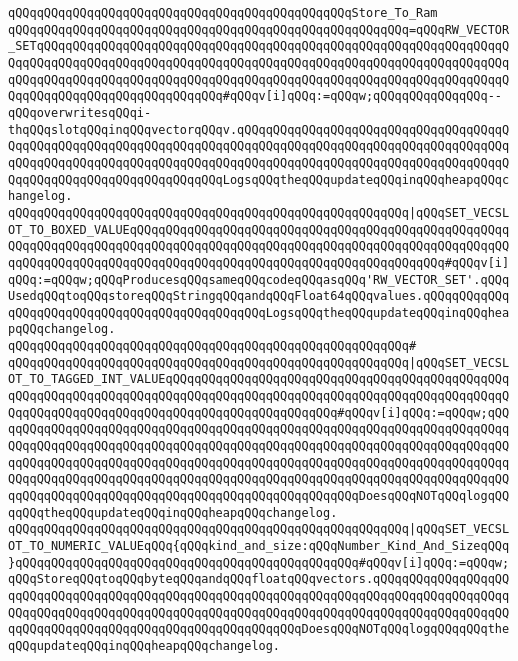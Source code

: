 \verb|qQQqqQQqqQQqqQQqqQQqqQQqqQQqqQQqqQQqqQQqqQQqqQQqStore_To_Ram|\newline
\verb|qQQqqQQqqQQqqQQqqQQqqQQqqQQqqQQqqQQqqQQqqQQqqQQqqQQqqQQq=qQQqRW_VECTOR_SETqQQqqQQqqQQqqQQqqQQqqQQqqQQqqQQqqQQqqQQqqQQqqQQqqQQqqQQqqQQqqQQqqQQqqQQqqQQqqQQqqQQqqQQqqQQqqQQqqQQqqQQqqQQqqQQqqQQqqQQqqQQqqQQqqQQqqQQqqQQqqQQqqQQqqQQqqQQqqQQqqQQqqQQqqQQqqQQqqQQqqQQqqQQqqQQqqQQqqQQqqQQqqQQqqQQqqQQqqQQqqQQqqQQqqQQqqQQq#qQQqv[i]qQQq:=qQQqw;qQQqqQQqqQQqqQQq--qQQqoverwritesqQQqi-thqQQqslotqQQqinqQQqvectorqQQqv.qQQqqQQqqQQqqQQqqQQqqQQqqQQqqQQqqQQqqQQqqQQqqQQqqQQqqQQqqQQqqQQqqQQqqQQqqQQqqQQqqQQqqQQqqQQqqQQqqQQqqQQqqQQqqQQqqQQqqQQqqQQqqQQqqQQqqQQqqQQqqQQqqQQqqQQqqQQqqQQqqQQqqQQqqQQqqQQqqQQqqQQqqQQqqQQqqQQqqQQqqQQqqQQqLogsqQQqtheqQQqupdateqQQqinqQQqheapqQQqchangelog.|\newline
\verb|qQQqqQQqqQQqqQQqqQQqqQQqqQQqqQQqqQQqqQQqqQQqqQQqqQQqqQQq|\verb#|qQQqSET_VECSLOT_TO_BOXED_VALUEqQQqqQQqqQQqqQQqqQQqqQQqqQQqqQQqqQQqqQQqqQQqqQQqqQQqqQQqqQQqqQQqqQQqqQQqqQQqqQQqqQQqqQQqqQQqqQQqqQQqqQQqqQQqqQQqqQQqqQQqqQQqqQQqqQQqqQQqqQQqqQQqqQQqqQQqqQQqqQQqqQQqqQQqqQQqqQQqqQQqqQQq#\verb|#qQQqv[i]qQQq:=qQQqw;qQQqProducesqQQqsameqQQqcodeqQQqasqQQq'RW_VECTOR_SET'.qQQqUsedqQQqtoqQQqstoreqQQqStringqQQqandqQQqFloat64qQQqvalues.qQQqqQQqqQQqqQQqqQQqqQQqqQQqqQQqqQQqqQQqqQQqqQQqLogsqQQqtheqQQqupdateqQQqinqQQqheapqQQqchangelog.|\newline
\verb|qQQqqQQqqQQqqQQqqQQqqQQqqQQqqQQqqQQqqQQqqQQqqQQqqQQqqQQq#|\newline
\verb|qQQqqQQqqQQqqQQqqQQqqQQqqQQqqQQqqQQqqQQqqQQqqQQqqQQqqQQq|\verb#|qQQqSET_VECSLOT_TO_TAGGED_INT_VALUEqQQqqQQqqQQqqQQqqQQqqQQqqQQqqQQqqQQqqQQqqQQqqQQqqQQqqQQqqQQqqQQqqQQqqQQqqQQqqQQqqQQqqQQqqQQqqQQqqQQqqQQqqQQqqQQqqQQqqQQqqQQqqQQqqQQqqQQqqQQqqQQqqQQqqQQqqQQqqQQqqQQq#\verb|#qQQqv[i]qQQq:=qQQqw;qQQqqQQqqQQqqQQqqQQqqQQqqQQqqQQqqQQqqQQqqQQqqQQqqQQqqQQqqQQqqQQqqQQqqQQqqQQqqQQqqQQqqQQqqQQqqQQqqQQqqQQqqQQqqQQqqQQqqQQqqQQqqQQqqQQqqQQqqQQqqQQqqQQqqQQqqQQqqQQqqQQqqQQqqQQqqQQqqQQqqQQqqQQqqQQqqQQqqQQqqQQqqQQqqQQqqQQqqQQqqQQqqQQqqQQqqQQqqQQqqQQqqQQqqQQqqQQqqQQqqQQqqQQqqQQqqQQqqQQqqQQqqQQqqQQqqQQqqQQqqQQqqQQqqQQqqQQqqQQqqQQqqQQqqQQqDoesqQQqNOTqQQqlogqQQqqQQqtheqQQqupdateqQQqinqQQqheapqQQqchangelog.|\newline
\verb|qQQqqQQqqQQqqQQqqQQqqQQqqQQqqQQqqQQqqQQqqQQqqQQqqQQqqQQq|\verb#|qQQqSET_VECSLOT_TO_NUMERIC_VALUEqQQq{qQQqkind_and_size:qQQqNumber_Kind_And_SizeqQQq}qQQqqQQqqQQqqQQqqQQqqQQqqQQqqQQqqQQqqQQqqQQqqQQq#\verb|#qQQqv[i]qQQq:=qQQqw;qQQqStoreqQQqtoqQQqbyteqQQqandqQQqfloatqQQqvectors.qQQqqQQqqQQqqQQqqQQqqQQqqQQqqQQqqQQqqQQqqQQqqQQqqQQqqQQqqQQqqQQqqQQqqQQqqQQqqQQqqQQqqQQqqQQqqQQqqQQqqQQqqQQqqQQqqQQqqQQqqQQqqQQqqQQqqQQqqQQqqQQqqQQqqQQqqQQqqQQqqQQqqQQqqQQqqQQqqQQqqQQqqQQqqQQqqQQqqQQqDoesqQQqNOTqQQqlogqQQqqQQqtheqQQqupdateqQQqinqQQqheapqQQqchangelog.|\newline
